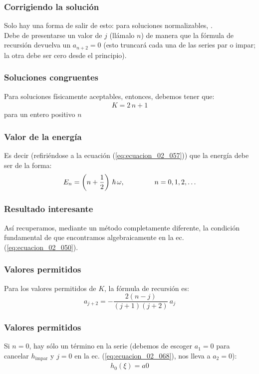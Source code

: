 \documentclass[12pt]{beamer}
\begin{document}
\begin{frame}
\frametitle{Corrigiendo la solución}
Solo hay una forma de salir de esto: \pause para soluciones normalizables, . 
\\
\bigskip
\pause
Debe de presentarse un valor  de $j$ (llámalo $n$) \pause de manera que la fórmula de recursión devuelva un $a_{n+2} = 0$ \pause (esto truncará cada una de las series par o impar; la otra debe ser cero desde el principio).
\end{frame}
\begin{frame}
\frametitle{Soluciones congruentes}
Para soluciones físicamente aceptables, entonces, debemos tener que:
\pause
\begin{align*}
K = 2 \, n + 1
\end{align*}
para un entero positivo $n$
\end{frame}
\begin{frame}
\frametitle{Valor de la energía}
Es decir (refiriéndose a la ecuación (\ref{eq:ecuacion_02_057})) que la energía debe ser de la forma:
\pause
\begin{equation}
E_{n} = \left( n + \dfrac{1}{2} \right) \, \hbar \, \omega , \hspace{1.5cm} n = 0, 1, 2, \ldots
\label{eq:ecuacion_02_067}
\end{equation}
\end{frame}
\begin{frame}
\frametitle{Resultado interesante}
Así recuperamos, mediante un método completamente diferente, \pause la condición fundamental de  que encontramos algebraicamente en la ec. (\ref{eq:ecuacion_02_050}).
\end{frame}
\begin{frame}
\frametitle{Valores permitidos}
Para los valores permitidos de $K$, la fórmula de recursión es:
\pause
\begin{equation}
a_{j+2} = - \dfrac{2 (n - j)}{(j + 1)(j + 2)} \, a_{j}
\label{eq:ecuacion_02_068}
\end{equation}
\end{frame}
\begin{frame}
\frametitle{Valores permitidos}
Si $n = 0$, \pause hay sólo un término en la serie (debemos de escoger $a_{1} = 0$ para cancelar $h_{\text{impar}}$ y $j=0$ en la ec. (\ref{eq:ecuacion_02_068}), nos lleva a $a_{2}=0$):
\pause
\begin{align*}
h_{0} (\xi) = a{0}
\end{align*}
\end{frame}
\end{document}
